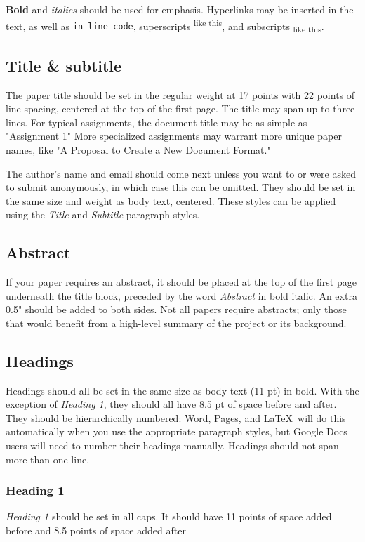 \documentclass[
	letterpaper, %
]{jdf}
\begin{document}
\textbf{Bold} and \textit{italics} should be used for emphasis. Hyperlinks may be inserted in the text, as well as {\tt in-line code}, superscripts\textsuperscript{ like this}, and subscripts\textsubscript{ like this}.

\subsection{Title \& subtitle}
The paper title should be set in the regular weight at 17 points with 22 points of line spacing, centered at the top of the first page. The title may span up to three lines. For typical assignments, the document title may be as simple as "Assignment 1" More specialized assignments may warrant more unique paper names, like "A Proposal to Create a New Document Format."

The author’s name and email should come next unless you want to or were asked to submit anonymously, in which case this can be omitted. They should be set in the same size and weight as body text, centered. These styles can be applied using the \emph{Title} and \emph{Subtitle} paragraph styles.

\subsection{Abstract}
If your paper requires an abstract, it should be placed at the top of the first page underneath the title block, preceded by the word \emph{Abstract} in bold italic. An extra 0.5" should be added to both sides. Not all papers require abstracts; only those that would benefit from a high-level summary of the project or its background.

\subsection{Headings}
Headings should all be set in the same size as body text (11 pt) in bold. With the exception of \emph{Heading 1}, they should all have 8.5 pt of space before and after. They should be hierarchically numbered: Word, Pages, and \LaTeX\ will do this automatically when you use the appropriate paragraph styles, but Google Docs users will need to number their headings manually. Headings should not span more than one line.

\subsubsection{Heading 1}
\emph{Heading 1} should be set in all caps. It should have 11 points of space added before and 8.5 points of space added after
\end{document}
